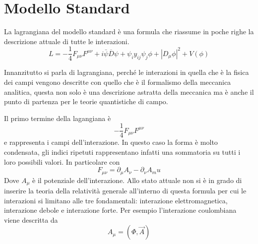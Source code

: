 
\section{Modello Standard}
La lagrangiana del modello standard è una formula che riassume in poche righe la descrizione attuale di tutte le interazioni.
\begin{equation}
L=-\frac{1}{4}F_{\mu\nu}F^{\mu\nu}+i\bar{\psi}\overline{D}\psi+\psi_i y_{ij}\psi_j\phi+|D_\mu\phi|^2+V(\phi)
\end{equation}

Innanzitutto si parla di lagrangiana, perché le interazioni in quella che è la fisica dei campi vengono descritte con quello che è il formalismo della meccanica analitica, questa non solo è una descrizione astratta della meccanica ma è anche il punto di partenza per le teorie quantistiche di campo.

Il primo termine della lagangiana è 
\begin{equation}
-\frac{1}{4}F_{\mu\nu}F^{\mu\nu}
\end{equation}
e rappresenta i campi dell'interazione.
In questo caso la forma è molto condensata, gli indici ripetuti rappresentano infatti una sommatoria su tutti i loro possibili valori.
In particolare con
\begin{equation}
F_{\mu \nu}=\partial_\mu A_\nu-\partial_\nu A_mu
\end{equation}
Dove $A_\mu$ è il potenziale dell'interazione.
Allo stato attuale non si è in grado di inserire la teoria della relatività generale all'interno di questa formula per cui le interazioni si limitano alle tre fondamentali: interazione elettromagnetica, interazione debole e interazione forte. 
Per esempio l'interazione coulombiana viene descritta da
\begin{equation}
A_\mu=(\Phi, \vec{A})
\end{equation}

